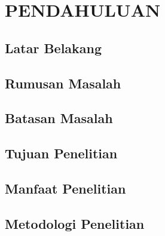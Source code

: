 \documentclass[ugmskripsi]{ugmskripsi}
\begin{document}
\begin{abstracteng}
  
\end{abstracteng}


\chapter{PENDAHULUAN}
\label{PENDAHULUAN}

	\section{Latar Belakang}
	\label{pendahuluan latar belakang}
	

	\section{Rumusan Masalah}
	\label{pendahuluan rumusan masalah}
	

	\section{Batasan Masalah}
	\label{pendahuluan batasan masalah}
	

	\section{Tujuan Penelitian}
	\label{pendahuluan tujuan penelitian}
	

	\section{Manfaat Penelitian}
	\label{pendahuluan manfaat penelitian}
	

	\section{Metodologi Penelitian}
	\label{pendahuluan metodologi penelitian}
  	
\end{document}
